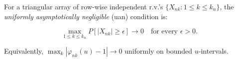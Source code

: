 For a triangular array of row-wise independent r.v.'s $\{X_{nk}: 1 \leq k \leq k_n\}$, the \textit{uniformly asymptotically negligible} (uan) condition is:

$$\max_{1 \leq k \leq k_n} P[|X_{nk}| \geq \epsilon] \to 0 \quad \text{for every } \epsilon > 0.$$

Equivalently, $\max_k |\varphi_{nk}(u) - 1| \to 0$ uniformly on bounded $u$-intervals.
